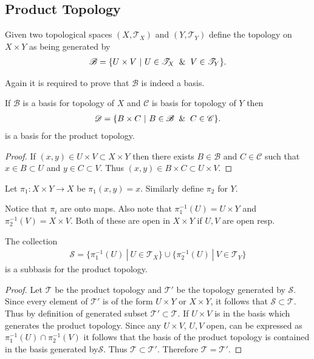 \subsection{Product Topology}
\begin{definition}
  Given two topological spaces $(X, \mathscr{T}_X)$ and $(Y, \mathscr{T}_Y)$ define the topology on $X\times Y$ as being generated by
  \begin{align*}
    \mathscr{B} = \{U\times V\ |\ U\in \mathscr{T}_X \And V\in \mathscr{T}_Y\}.
  \end{align*}
\end{definition}
\begin{observation}
  Again it is required to prove that $ \mathscr{B}$ is indeed a basis.
\end{observation}
\begin{theorem}
  If $\mathscr{B}$ is a basis for topology of $X$ and $ \mathscr{C}$ is basis for topology of $Y$ then
  \begin{align*}
    \mathscr{D} = \{B\times C\ |\ B\in \mathscr{B} \And C\in \mathscr{C}\}.
  \end{align*}
  is a basis for the product topology.
\end{theorem}
\begin{proof}
  If $(x,y)\in U\times V\subset X\times Y$ then there exists $B\in \mathscr{B}$ and $C\in \mathscr{C}$ such that $x\in B\subset U$ and $y\in C \subset V$. Thus $(x,y)\in B\times C \subset U\times V$. 
\end{proof}
\begin{definition}
  Let $\pi_1:X\times Y \to X$ be $\pi_1(x,y) = x$. Similarly define $\pi_2$ for $Y$.
\end{definition}
\begin{observation}
  Notice that $\pi_i$ are onto maps. Also note that $\pi_1^{-1}(U) = U \times Y$ and $\pi_2^{-1}(V) = X\times V$. Both of these are open in $X\times Y$ if $U,V$ are open resp.
\end{observation}
\begin{theorem}
  The collection
  \begin{align*}
    \mathscr{S} = \{\pi_1^{-1}(U)\ |\ U\in \mathscr{T}_X\} \cup \{\pi_2^{-1}(U)\ |\ V\in \mathscr{T}_Y\}
  \end{align*}
  is a subbasis for the product topology.
\end{theorem}
\begin{proof}
  Let $ \mathscr{T}$ be the product topology and $ \mathscr{T}'$ be the topology generated by $ \mathscr{S}$. Since every element of $ \mathscr{T}'$ is of the form $U\times Y$ or $X\times Y$, it follows that $ \mathscr{S} \subset \mathscr{T}$. Thus by definition of generated subset $ \mathscr{T}' \subset \mathscr{T}$. If $U\times V$ is in the basis which generates the product topology. Since any $U\times V$, $U,V$ open, can be expressed as $\pi_1^{-1}(U) \cap \pi_2^{-1}(V)$ it follows that the basis of the product topology is contained in the basis generated by$ \mathscr{S}$. Thus $ \mathscr{T} \subset \mathscr{T}'$. Therefore $ \mathscr{T} = \mathscr{T}'$.
\end{proof}


